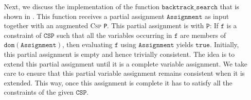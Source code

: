 Next, we discuss the implementation of the function $\texttt{backtrack\_search}$  that is shown in
.  This function receives a partial assignment
$\texttt{Assignment}$ as input together with an augmented \textsc{Csp} \texttt{P}.  This partial assignment is
 with $\texttt{P}$:  If $\texttt{f}$ is a constraint of $\texttt{CSP}$ such that
all the variables occurring in $\texttt{f}$ are members of $\texttt{dom}(\texttt{Assignment})$, then evaluating
$\texttt{f}$ using $\texttt{Assignment}$ yields $\texttt{true}$.  Initially, this partial assignment is empty
and hence trivially consistent.  The idea is to extend this partial assignment until it is a complete variable 
assignment.  We take care to ensure that this partial variable assignment remains consistent when it is
extended.  This way, once this assignment is complete it has to satisfy all the constraints of the given $\texttt{CSP}$.
